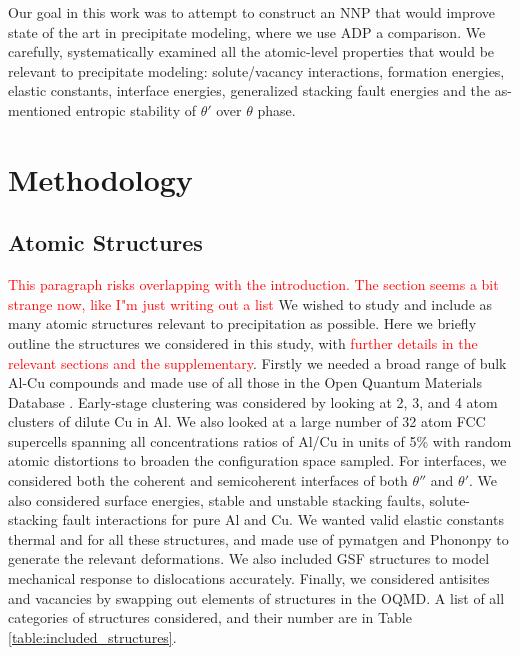 \documentclass{article}
\begin{document}
Our goal in this work was to attempt to construct an NNP that would improve state of the art in precipitate modeling, where we use ADP a comparison.
We carefully, systematically examined all the atomic-level properties that would be relevant to precipitate modeling: solute/vacancy interactions, formation energies, elastic constants, interface energies, generalized stacking fault energies and the as-mentioned entropic stability of $\theta'$ over $\theta$ phase.

\section{Methodology}
\subsection{Atomic Structures}
\textcolor{red}{This paragraph risks overlapping with the introduction.
The section seems a bit strange now, like I"m just writing out a list}
We wished to study and include as many atomic structures relevant to precipitation as possible.
 Here we briefly outline the structures we considered in this study, with \textcolor{red}{further details in the relevant sections and the supplementary}.  
Firstly we needed a broad range of bulk Al-Cu compounds and made use of all those in the Open Quantum Materials Database \cite{Kirklin2015}.
Early-stage clustering was considered by looking at 2, 3, and 4 atom clusters of dilute Cu in Al. We also looked at a large number of 32 atom FCC supercells spanning all concentrations ratios of Al/Cu in units of 5\% 
with random atomic distortions to broaden the configuration space sampled.  For interfaces, we considered both the coherent and semicoherent interfaces of both $\theta''$ and $\theta'$.  We also considered surface energies,  stable and unstable stacking faults, solute-stacking fault interactions for pure Al and Cu.
We wanted valid elastic constants thermal and for all these structures, and made use of pymatgen\cite{Ong2013} and Phononpy\cite{Togo2015FirstScience} to generate the relevant deformations.
We also included GSF structures to model mechanical response to dislocations accurately. Finally, we considered
antisites and vacancies by swapping out elements of structures in the OQMD. A list of all categories of structures considered, and their number are in Table \ref{table:included_structures}.
\end{document}
